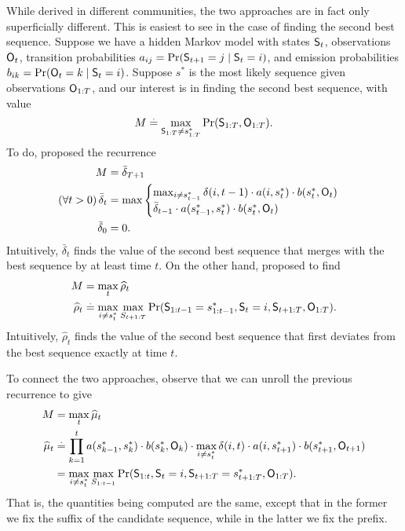 While derived in different communities, the two approaches are in fact only superficially different.
This is easiest to see in the case of finding the second best sequence.
Suppose we have a hidden Markov model with states $\mathsf{S}_{t}$, observations $\mathsf{O}_{t}$, transition probabilities $a_{ij} = \Pr( \mathsf{S}_{t+1} = j \mid \mathsf{S}_t = i )$, and emission probabilities $b_{ik} = \Pr( \mathsf{O}_{t} = k \mid \mathsf{S}_t = i )$.
Suppose $s^*$ is the most likely sequence given observations $\mathsf{O}_{1:T}$,
and our interest is in finding the second best sequence, with value
$$ M \stackrel{.}{=} \max_{\mathsf{S}_{1:T} \neq s^*_{1 : T}}{\Pr( \mathsf{S}_{1:T}, \mathsf{O}_{1:T} )}. $$
To do, \citet{seshadri1994list} proposed the recurrence
\begin{align*}
	M &= \bar{\delta}_{T+1} \\
    (\forall t > 0) \, \bar{\delta}_t &= 
    \max
    \begin{cases}
    \max_{i \neq s^*_{t-1}} \delta(i, t-1) \cdot a( i, s^*_{t} ) \cdot b( s^*_{t}, \mathsf{O}_{t} ) \\
    \bar{\delta}_{t - 1} \cdot a( s^*_{t - 1}, s^*_{t} ) \cdot b( s^*_{t}, \mathsf{O}_{t} )
    \end{cases} \\
    \bar{\delta}_0 &= 0.
\end{align*}
Intuitively, $\bar{\delta}_t$ finds the value of the second best sequence that merges with the best sequence by at least time $t$.
On the other hand, \citet{nilsson2001sequentially} proposed to find
\begin{align*}
	M &= \max_t \widehat{\rho}_t \\
	\widehat{\rho}_{t} &\stackrel{.}{=} \max_{i \neq s^*_{t}} \max_{S_{t+1:T}} {\Pr( \mathsf{S}_{1:t-1} = s^*_{1:t-1}, \mathsf{S}_t = i, \mathsf{S}_{t+1:T}, \mathsf{O}_{1:T} )}.
\end{align*}
Intuitively, $\widehat{\rho}_t$ finds the value of the second best sequence that first deviates from the best sequence exactly at time $t$.

To connect the two approaches, observe that we can unroll the previous recurrence to give
\begin{align*}
	M &= \max_t \widehat{\mu}_t \\
	\widehat{\mu}_{t} &\stackrel{.}{=} \prod_{k = 1}^t a( s^*_{k-1}, s^*_{k} ) \cdot b( s^*_{k}, \mathsf{O}_{k} ) \cdot \max_{i \neq s^*_{t}} \delta(i, t) \cdot a( i, s^*_{t+1} ) \cdot b( s^*_{t+1}, \mathsf{O}_{t+1} ) \\
	&= \max_{i \neq s^*_{t}} \max_{S_{1:t-1}} {\Pr( \mathsf{S}_{1:t}, \mathsf{S}_t = i, \mathsf{S}_{t+1:T} = s^*_{t+1:T}, \mathsf{O}_{1:T} )}.
\end{align*}
That is, the quantities being computed are the same, except that in the former we fix the suffix of the candidate sequence, while in the latter we fix the prefix.
